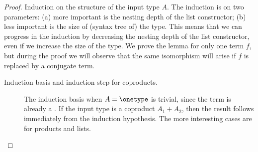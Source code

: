 \begin{proof}
    Induction on the structure of the input type $A$. The induction is on two parameters: (a) more important is the nesting depth of the list constructor; (b) less important is the size of (syntax tree of) the type. This means that we can progress in the induction by decreasing the nesting depth of the list constructor, even if we increase the size of the type. We prove the lemma for only one term $f$, but during the proof we will  observe that the same isomorphism will arise if $f$ is replaced by a conjugate term. 

    \begin{description}
    \item[Induction basis and induction step for coproducts.]
    The induction basis when $A = \onetype$ is trivial, since the term is already a . If the input type is a coproduct $A_1 + A_2$, then the result follows immediately from the induction hypothesis. The more interesting cases are for products and lists. 
    

\end{description}
\end{proof}

